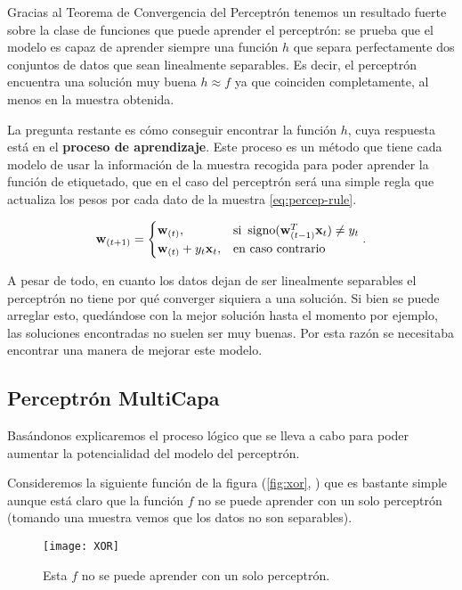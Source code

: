 Gracias al Teorema de Convergencia del Perceptrón \cite{novikoff1963convergence} tenemos un resultado fuerte sobre la clase de funciones que puede aprender el perceptrón: se prueba que el modelo es capaz de aprender siempre una función $h$ que separa perfectamente dos conjuntos de datos que sean linealmente separables. Es decir, el perceptrón encuentra una solución muy buena $h \approx f$ ya que coinciden completamente, al menos en la muestra obtenida.

La pregunta restante es cómo conseguir encontrar la función $h$, cuya respuesta está en el \textbf{proceso de aprendizaje}. Este proceso es un método que tiene cada modelo de usar la información de la muestra recogida para poder aprender la función de etiquetado, que en el caso del perceptrón será una simple regla que actualiza los pesos por cada dato de la muestra \eqref{eq:percep-rule}.

\begin{equation}
  \textbf{w}_{(t + 1)} =
  \begin{cases}
    \textbf{w}_{(t)}, & \text{si } \operatorname{signo}(\textbf{w}^T_{(t-1)} \textbf{x}_t) \neq y_t \\
    \textbf{w}_{(t)} + y_t \textbf{x}_t, & \text{en caso contrario}
  \end{cases}.
  \label{eq:percep-rule}
\end{equation}

A pesar de todo, en cuanto los datos dejan de ser linealmente separables el perceptrón no tiene por qué converger siquiera a una solución. Si bien se puede arreglar esto, quedándose con la mejor solución hasta el momento por ejemplo, las soluciones encontradas no suelen ser muy buenas. Por esta razón se necesitaba encontrar una manera de mejorar este modelo.

\subsection{Perceptrón MultiCapa}

Basándonos \cite{abu2012learning} explicaremos el proceso lógico que se lleva a cabo para poder aumentar la potencialidad del modelo del perceptrón.

Consideremos la siguiente función de la figura (\autoref{fig:xor}, \cite{abu2012learning}) que es bastante simple aunque está claro que la función $f$ no se puede aprender con un solo perceptrón (tomando una muestra vemos que los datos no son separables).

\begin{figure}[htpb]
  \centering
  \texttt{[image: XOR]}
  \caption{Esta $f$ no se puede aprender con un solo perceptrón.}
  \label{fig:xor}
\end{figure}

